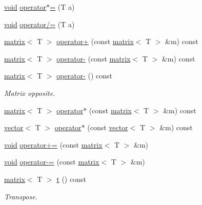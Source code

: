 \begin{DoxyCompactItemize}
\item 
\hyperlink{png_8h_aa8c59027f9ab2769342f248709d68d17}{void} \hyperlink{classlibNumerics_1_1matrix_a4f4ae2a4484977c91a69a1f6108dd110}{operator$\ast$=} (T a)
\item 
\hyperlink{png_8h_aa8c59027f9ab2769342f248709d68d17}{void} \hyperlink{classlibNumerics_1_1matrix_ae5a2d49fa1997e2a2a384cbb72e3b4a0}{operator/=} (T a)
\item 
\hyperlink{classlibNumerics_1_1matrix}{matrix}$<$ T $>$ \hyperlink{classlibNumerics_1_1matrix_a0ba161ccac440594410739248c1ecd25}{operator+} (const \hyperlink{classlibNumerics_1_1matrix}{matrix}$<$ T $>$ \&m) const 
\item 
\hyperlink{classlibNumerics_1_1matrix}{matrix}$<$ T $>$ \hyperlink{classlibNumerics_1_1matrix_a560e86a5975e72a6de989a3664494124}{operator-\/} (const \hyperlink{classlibNumerics_1_1matrix}{matrix}$<$ T $>$ \&m) const 
\item 
\hyperlink{classlibNumerics_1_1matrix}{matrix}$<$ T $>$ \hyperlink{classlibNumerics_1_1matrix_a9f5de4d60ed563d046639e51298149cf}{operator-\/} () const 
\begin{DoxyCompactList}\small\item\em Matrix opposite. \end{DoxyCompactList}\item 
\hyperlink{classlibNumerics_1_1matrix}{matrix}$<$ T $>$ \hyperlink{classlibNumerics_1_1matrix_a1b25c1c07bb9ceaa5a932ca7a095fc7f}{operator$\ast$} (const \hyperlink{classlibNumerics_1_1matrix}{matrix}$<$ T $>$ \&m) const 
\item 
\hyperlink{classlibNumerics_1_1vector}{vector}$<$ T $>$ \hyperlink{classlibNumerics_1_1matrix_abbdbe45924362f9cbc5ccf4703483d1f}{operator$\ast$} (const \hyperlink{classlibNumerics_1_1vector}{vector}$<$ T $>$ \&m) const 
\item 
\hyperlink{png_8h_aa8c59027f9ab2769342f248709d68d17}{void} \hyperlink{classlibNumerics_1_1matrix_ad446cea72f7a4ca6e2e1b6f2b3aab64e}{operator+=} (const \hyperlink{classlibNumerics_1_1matrix}{matrix}$<$ T $>$ \&m)
\item 
\hyperlink{png_8h_aa8c59027f9ab2769342f248709d68d17}{void} \hyperlink{classlibNumerics_1_1matrix_a08c131d90c4385aa33a5cff997858576}{operator-\/=} (const \hyperlink{classlibNumerics_1_1matrix}{matrix}$<$ T $>$ \&m)
\item 
\hyperlink{classlibNumerics_1_1matrix}{matrix}$<$ T $>$ \hyperlink{classlibNumerics_1_1matrix_ada1a0e75669ecd6be5e1d19f02fd5763}{t} () const 
\begin{DoxyCompactList}\small\item\em Transpose. \end{DoxyCompactList}\item 

\end{DoxyCompactItemize}
